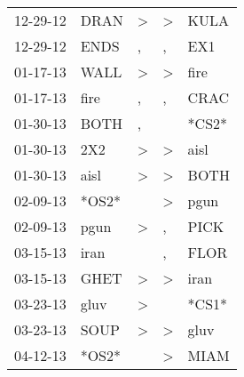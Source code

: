 \begin{supertabular}{p{0.07\textwidth}p{0.06\textwidth}p{0.02\textwidth}p{0.02\textwidth}p{0.06\textwidth}}
          12-29-12\textsuperscript{} &           DRAN\textsuperscript{} &     \textgreater &     \textgreater &           KULA\textsuperscript{} \\
          12-29-12\textsuperscript{} &           ENDS\textsuperscript{} &                , &                , &            EX1\textsuperscript{} \\
          01-17-13\textsuperscript{} &           WALL\textsuperscript{} &     \textgreater &     \textgreater &           fire\textsuperscript{} \\
          01-17-13\textsuperscript{} &           fire\textsuperscript{} &                , &                , &           CRAC\textsuperscript{} \\
          01-30-13\textsuperscript{} &           BOTH\textsuperscript{} &                , &                  &                            *CS2* \\
          01-30-13\textsuperscript{} &            2X2\textsuperscript{} &     \textgreater &     \textgreater &           aisl\textsuperscript{} \\
          01-30-13\textsuperscript{} &           aisl\textsuperscript{} &     \textgreater &     \textgreater &           BOTH\textsuperscript{} \\
          02-09-13\textsuperscript{} &                            *OS2* &                  &     \textgreater &           pgun\textsuperscript{} \\
          02-09-13\textsuperscript{} &           pgun\textsuperscript{} &     \textgreater &                , &           PICK\textsuperscript{} \\
          03-15-13\textsuperscript{} &           iran\textsuperscript{} &                  &                , &           FLOR\textsuperscript{} \\
          03-15-13\textsuperscript{} &           GHET\textsuperscript{} &     \textgreater &     \textgreater &           iran\textsuperscript{} \\
          03-23-13\textsuperscript{} &           gluv\textsuperscript{} &     \textgreater &                  &                            *CS1* \\
          03-23-13\textsuperscript{} &           SOUP\textsuperscript{} &     \textgreater &     \textgreater &           gluv\textsuperscript{} \\
          04-12-13\textsuperscript{} &                            *OS2* &                  &     \textgreater &           MIAM\textsuperscript{} \\

\end{supertabular}
